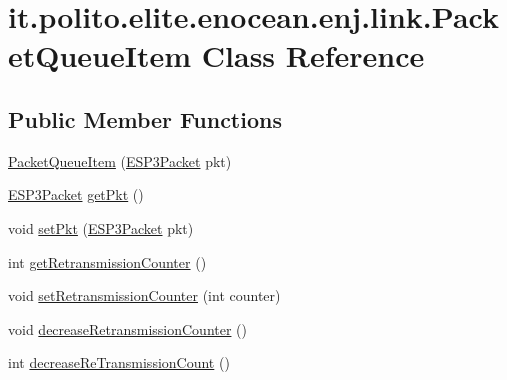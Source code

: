 \hypertarget{classit_1_1polito_1_1elite_1_1enocean_1_1enj_1_1link_1_1_packet_queue_item}{}\section{it.\+polito.\+elite.\+enocean.\+enj.\+link.\+Packet\+Queue\+Item Class Reference}
\label{classit_1_1polito_1_1elite_1_1enocean_1_1enj_1_1link_1_1_packet_queue_item}
\subsection*{Public Member Functions}
\begin{DoxyCompactItemize}
\item 
\hyperlink{classit_1_1polito_1_1elite_1_1enocean_1_1enj_1_1link_1_1_packet_queue_item_a869936e05900f0255113b643e98d94cc}{Packet\+Queue\+Item} (\hyperlink{classit_1_1polito_1_1elite_1_1enocean_1_1protocol_1_1serial_1_1v3_1_1network_1_1packet_1_1_e_s_p3_packet}{E\+S\+P3\+Packet} pkt)
\item 
\hyperlink{classit_1_1polito_1_1elite_1_1enocean_1_1protocol_1_1serial_1_1v3_1_1network_1_1packet_1_1_e_s_p3_packet}{E\+S\+P3\+Packet} \hyperlink{classit_1_1polito_1_1elite_1_1enocean_1_1enj_1_1link_1_1_packet_queue_item_a2c92f41c178958824f112b5b8cff09bb}{get\+Pkt} ()
\item 
void \hyperlink{classit_1_1polito_1_1elite_1_1enocean_1_1enj_1_1link_1_1_packet_queue_item_a5929fdf35cfc4f47f6c4e0ce5157e91d}{set\+Pkt} (\hyperlink{classit_1_1polito_1_1elite_1_1enocean_1_1protocol_1_1serial_1_1v3_1_1network_1_1packet_1_1_e_s_p3_packet}{E\+S\+P3\+Packet} pkt)
\item 
int \hyperlink{classit_1_1polito_1_1elite_1_1enocean_1_1enj_1_1link_1_1_packet_queue_item_abdbd08f44a924454093e046ded073b99}{get\+Retransmission\+Counter} ()
\item 
void \hyperlink{classit_1_1polito_1_1elite_1_1enocean_1_1enj_1_1link_1_1_packet_queue_item_a9e1ae9b98516abf72eb7fb5de6fcc853}{set\+Retransmission\+Counter} (int counter)
\item 
void \hyperlink{classit_1_1polito_1_1elite_1_1enocean_1_1enj_1_1link_1_1_packet_queue_item_a88def3a14b97244d26e56739e2d3f2cb}{decrease\+Retransmission\+Counter} ()
\item 
int \hyperlink{classit_1_1polito_1_1elite_1_1enocean_1_1enj_1_1link_1_1_packet_queue_item_af092ce7adaa96e710397b0b73ff958af}{decrease\+Re\+Transmission\+Count} ()
\end{DoxyCompactItemize}
